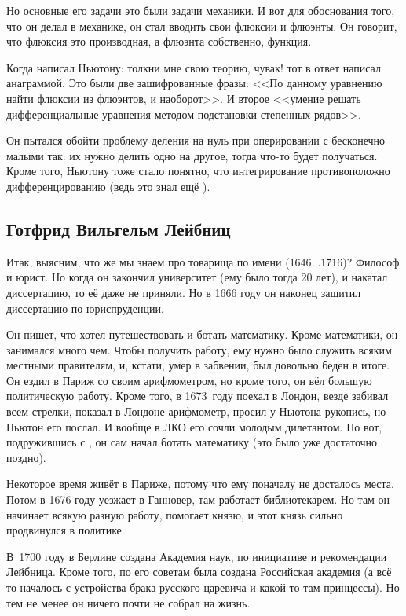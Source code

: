 \documentclass[a4paper,oneside,fleqn,10pt]{article}
\newcommand{\pe}[2]{${#1}\ldots{#2}$}
\begin{document}
Но основные его задачи это были задачи механики. И вот для обоснования
того, что он делал в механике, он стал вводить свои флюксии и флюэнты.
Он говорит, что флюксия это производная, а флюэнта собственно,
функция.

Когда  написал Ньютону: толкни мне свою теорию, чувак!
тот в ответ написал анаграммой.  Это были две зашифрованные фразы:
<<По данному уравнению найти флюксии из флюэнтов, и наоборот>>.  И
второе <<умение решать дифференциальные уравнения методом подстановки
степенных рядов>>.

Он пытался обойти проблему деления на нуль при оперировании с
бесконечно малыми так: их нужно делить одно на другое, тогда что-то
будет получаться. Кроме того, Ньютону тоже стало понятно, что
интегрирование противоположно дифференцированию (ведь это знал ещё
).

\subsection{Готфрид Вильгельм Лейбниц}

Итак, выясним, что же мы знаем про товарища по имени  (\pe{1646}{1716})?
Философ и юрист. Но когда он закончил университет (ему было тогда 20
лет), и накатал диссертацию, то её даже не приняли. Но в 1666 году он
наконец защитил диссертацию по юриспруденции.

Он пишет, что хотел путешествовать и ботать математику. Кроме
математики, он занимался много чем. Чтобы получить работу, ему нужно
было служить всяким местными правителям, и, кстати, умер в забвении,
был довольно беден в итоге.  Он ездил в Париж со своим арифмометром,
но кроме того, он вёл большую политическую работу. Кроме того, в
1673~году поехал в Лондон, везде забивал всем стрелки, показал в
Лондоне арифмометр, просил у Ньютона рукопись, но Ньютон его послал.
И вообще в ЛКО его сочли молодым дилетантом. Но вот, подружившись с
, он сам начал ботать математику (это было
уже достаточно поздно).

Некоторое время живёт в Париже, потому что ему поначалу не досталось
места.  Потом в 1676 году уезжает в Ганновер, там работает
библиотекарем.  Но там он начинает всякую разную работу, помогает
князю, и этот князь сильно продвинулся в политике.

В~1700 году в Берлине создана Академия наук, по инициативе и
рекомендации Лейбница. Кроме того, по его советам была создана
Российская академия (а всё то началось с устройства брака русского
царевича и какой то там принцессы).  Но тем не менее он ничего почти
не собрал на жизнь.
\end{document}
